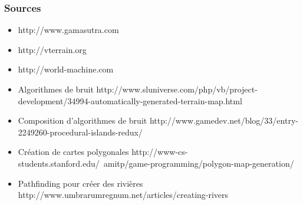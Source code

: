 \documentclass{beamer}
\begin{document}
\begin{frame}
  \frametitle{Sources}
  \begin{itemize}
  \item http://www.gamasutra.com
  \item http://vterrain.org
  \item http://world-machine.com
  \item Algorithmes de bruit {\tiny http://www.sluniverse.com/php/vb/project-development/34994-automatically-generated-terrain-map.html}
  \item Composition d'algorithmes de bruit {\tiny http://www.gamedev.net/blog/33/entry-2249260-procedural-islands-redux/}
  \item Création de cartes polygonales {\tiny http://www-cs-students.stanford.edu/~amitp/game-programming/polygon-map-generation/}
  \item Pathfinding pour créer des rivières {\tiny http://www.umbrarumregnum.net/articles/creating-rivers}
  \end{itemize}
\end{frame}
\end{document}

